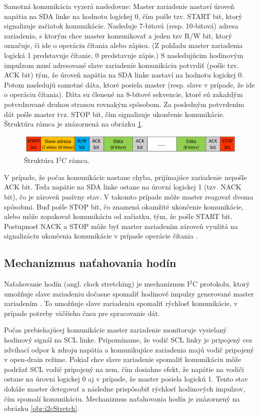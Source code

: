 Samotná komunikácia vyzerá nasledovne: Master zariadenie nastaví úroveň napätia na SDA linke na hodnotu logickej 0, čím pošle tzv. START bit, ktorý signalizuje začiatok komunikácie. Nasleduje 7-bitová (resp. 10-bitová) adresa zariadenia, s ktorým chce master komunikovať a jeden tzv R/W bit, ktorý označuje, či ide o operáciu čítania alebo zápisu. (Z pohľadu master zariadenia logická 1 predstavuje čítanie, 0 predstavuje zápis.) S nasledujúcim hodinovým impulzom musí adresované slave zariadenie komunikáciu potvrdiť (pošle tzv. ACK bit) tým, že úroveň napätia na SDA linke nastaví na hodnotu logickej 0. Potom nasledujú samotné dáta, ktoré posiela master (resp. slave v prípade, že ide o operáciu čítania). Dáta su členené na 8-bitové sekvencie, ktoré sú zakaždým potvrdzované druhou stranou rovnakým spôsobom. Za posledným potvrdením dát pošle master tvz. STOP bit, čím signalizuje ukončenie komunikácie. Štruktúra rámca je znázornená na obrázku \ref{obr:i2cFrame}.

\begin{figure}
    \centerline{\includegraphics[width=1\textwidth]{images/i2cFrame.png}}
    \caption[Štruktúra I$^2$C rámca]{Štruktúra I$^2$C rámca.}
    \label{obr:i2cFrame}
\end{figure}

V prípade, že počas komunikácie nastane chyba, prijímajúce zariadenie nepošle ACK bit. Teda napätie na SDA linke ostane na úrovni logickej 1 (tzv. NACK bit), čo je zároveň pasívny stav. V takomto prípade môže master reagovať dvoma spôsobmi. Buď pošle STOP bit, čo znamená okamžité ukončenie komunikácie, alebo môže zopakovať komunikáciu od začiatku, tým, že pošle START bit. Postupnosť NACK a STOP môže byť master zariadením zároveň využitá na signalizáciu ukončenia komunikácie v prípade operácie čítania \cite{i2cBus}.

\subsection{Mechanizmus naťahovania hodín}
Naťahovanie hodín (angl. clock stretching) je mechanizmus I$^2$C protokolu, ktorý umožňuje slave zariadeniu dočasne spomaliť hodinové impulzy generované master zariadením \cite{i2cBus}. To umožňuje slave zariadeniu spomaliť rýchlosť komunikácie, v prípade potreby väčšieho času pre spracovanie dát.

Počas prebiehajúcej komunikácie master zariadenie monitoruje vysielaný hodinový signál na SCL linke. Pripomíname, že vodič SCL linky je pripojený cez zdvíhací odpor k zdroju napätia a komunikujúce zariadenia majú vodič pripojený v open-drain režime. Pokiaľ chce slave zariadenie spomaliť komunikáciu môže podržať SCL vodič pripojený na zem, čím dosiahne efekt, že napätie na vodiči ostane na úrovni logickej 0 aj v prípade, že master posiela logickú 1. Tento stav dokáže master detegovať a následne prispôsobiť rýchlosť hodinových impulzov, čím spomalí komunikáciu. Mechanizmus naťahovania hodín je znázornený na obrázku \ref{obr:i2cStretch}.

